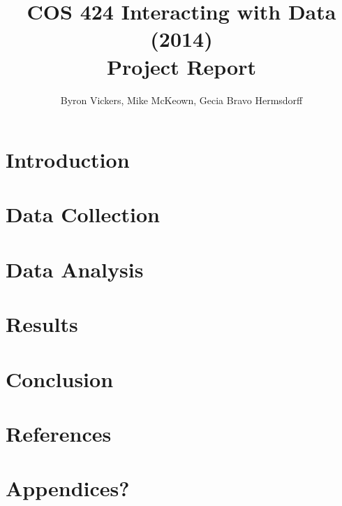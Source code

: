 \documentclass[10pt]{article}
\author{Byron Vickers, Mike McKeown, Gecia Bravo Hermsdorff}
\title{COS 424 Interacting with Data (2014) \\ {\Large Project Report}}
\date{}
\begin{document}
\maketitle

\section{Introduction}


\section{Data Collection}


\section{Data Analysis}


\section{Results}


\section{Conclusion}


\section{References}


\section{Appendices?}
\end{document}
